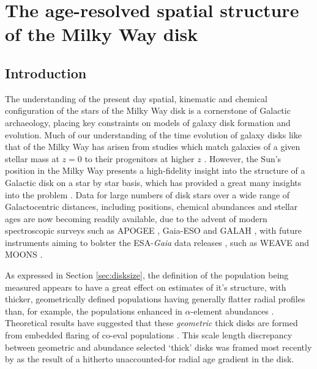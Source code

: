 \chapter{The age-resolved spatial structure of the Milky Way disk}
\label{chapter:apogeestruc}
\section{Introduction}

 The understanding of the present day spatial, kinematic and chemical configuration of the stars of the Milky Way disk is a cornerstone of Galactic archaeology, placing key constraints on models of galaxy disk formation and evolution. Much of our understanding of the time evolution of galaxy disks like that of the Milky Way has arisen from studies which match galaxies of a given stellar mass at $z=0$ to their progenitors at higher $z$ \citep[and therefore, lookback time, e.g. ][]{2013ApJ...771L..35V,2015ApJ...803...26P,2016MNRAS.462.4495H}. However, the Sun's position in the Milky Way presents a high-fidelity insight into the structure of a Galactic disk on a star by star basis, which has provided a great many insights into the problem \citep[e.g.][]{1962ApJ...136..748E,1993A&A...275..101E,2013A&A...560A.109H}. Data for large numbers of disk stars over a wide range of Galactocentric distances, including positions, chemical abundances and stellar ages are now becoming readily available, due to the advent of modern spectroscopic surveys such as APOGEE \citep{2015arXiv150905420M}, Gaia-ESO \citep{2012Msngr.147...25G} and GALAH \citep{2016arXiv160902822M}, with future instruments aiming to bolster the ESA-\emph{Gaia} data releases \citep{2016A&A...595A...1G}, such as WEAVE \citep{2014SPIE.9147E..0LD} and MOONS \citep{2012SPIE.8446E..0SC}.

As expressed in Section \ref{sec:disksize}, the definition of the population being measured appears to have a great effect on estimates of it's structure, with thicker, geometrically defined populations having generally flatter radial profiles \citep[e.g.][]{2008ApJ...673..864J} than, for example, the populations enhanced in $\alpha$-element abundances \citep[e.g.][]{2012ApJ...752...51C,2012ApJ...753..148B,2016ApJ...823...30B}. Theoretical results have suggested that these \emph{geometric} thick disks are formed from embedded flaring of co-eval populations  \citep{2015ApJ...804L...9M}. This scale length discrepancy between geometric and abundance selected `thick' disks was framed most recently by \citet{2016arXiv160901168M} as the result of a hitherto unaccounted-for radial age gradient in the disk.

